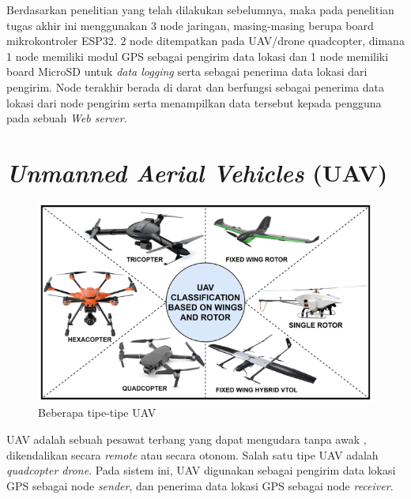 Berdasarkan penelitian yang telah dilakukan sebelumnya, maka pada penelitian tugas akhir ini menggunakan 3 node jaringan, masing-masing berupa board mikrokontroler ESP32. 2 node ditempatkan pada UAV/drone quadcopter, dimana 1 node memiliki modul GPS sebagai pengirim data lokasi dan 1 node memiliki board MicroSD untuk \textit{data logging} serta sebagai penerima data lokasi dari pengirim. Node terakhir berada di darat dan berfungsi sebagai penerima data lokasi dari node pengirim serta menampilkan data tersebut kepada pengguna pada sebuah \textit{Web server}.

\section{\textit{Unmanned Aerial Vehicles} (UAV)}
\begin{figure}[H]
	\centering
	\includegraphics[scale=0.4]{./assets/TypesOfUAVs}
	\caption{Beberapa tipe-tipe UAV \cite{chamola_comprehensive_2020}}
\end{figure}
UAV adalah sebuah pesawat terbang yang dapat mengudara tanpa awak \cite{lakshminarayananJointNetworkDisaster2015}, dikendalikan secara \textit{remote} atau secara otonom. Salah satu tipe UAV adalah \textit{quadcopter drone}. Pada sistem ini, UAV digunakan sebagai pengirim data lokasi GPS sebagai node \textit{sender}, dan penerima data lokasi GPS sebagai node \textit{receiver}.

